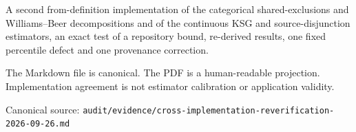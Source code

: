 {\begin{titlepage}
\begin{minipage}{0.86\textwidth}
      \large
      A second from-definition implementation of the categorical shared-exclusions and
      Williams--Beer decompositions and of the continuous KSG and source-disjunction estimators,
      an exact test of a repository bound, re-derived results, one fixed percentile defect and one
      provenance correction.
    \end{minipage}\par
    \vfill
    \begin{minipage}{0.88\textwidth}
      \small\color{PidSlate}
      The Markdown file is canonical. The PDF is a human-readable projection.
      Implementation agreement is not estimator calibration or application validity.
    \end{minipage}\par
    \vspace{12mm}
    {\large\color{PidInk}\@author\par}
    \vspace{3mm}
    {\large\color{PidInk}\@date\par}
    \vspace{3mm}
    {\small\color{PidSlate}Canonical source: \texttt{audit/evidence/cross-implementation-reverification-2026-09-26.md}\par}
    \vspace{17mm}
  \end{titlepage}
  \hypersetup{pageanchor=true}%
  \setcounter{page}{1}%
  \pagecolor{PidIvory}\color{PidInk}
}
\makeatother
